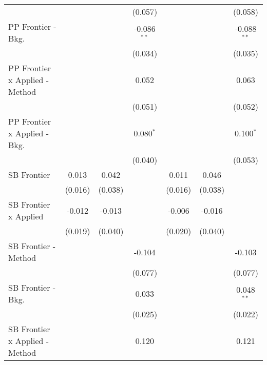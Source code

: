 \begin{tabular}{lcccccc}
                                  &              &              & (0.057)       &             &              & (0.058)\\   
   PP Frontier - Bkg.             &              &              & -0.086$^{**}$ &             &              & -0.088$^{**}$\\   
                                  &              &              & (0.034)       &             &              & (0.035)\\   
   PP Frontier x Applied - Method &              &              & 0.052         &             &              & 0.063\\   
                                  &              &              & (0.051)       &             &              & (0.052)\\   
   PP Frontier x Applied - Bkg.   &              &              & 0.080$^{*}$   &             &              & 0.100$^{*}$\\   
                                  &              &              & (0.040)       &             &              & (0.053)\\   
   SB Frontier                    & 0.013        & 0.042        &               & 0.011       & 0.046        &   \\   
                                  & (0.016)      & (0.038)      &               & (0.016)     & (0.038)      &   \\   
   SB Frontier x Applied          & -0.012       & -0.013       &               & -0.006      & -0.016       &   \\   
                                  & (0.019)      & (0.040)      &               & (0.020)     & (0.040)      &   \\   
   SB Frontier - Method           &              &              & -0.104        &             &              & -0.103\\   
                                  &              &              & (0.077)       &             &              & (0.077)\\   
   SB Frontier - Bkg.             &              &              & 0.033         &             &              & 0.048$^{**}$\\   
                                  &              &              & (0.025)       &             &              & (0.022)\\   
   SB Frontier x Applied - Method &              &              & 0.120         &             &              & 0.121\\   

\end{tabular}
